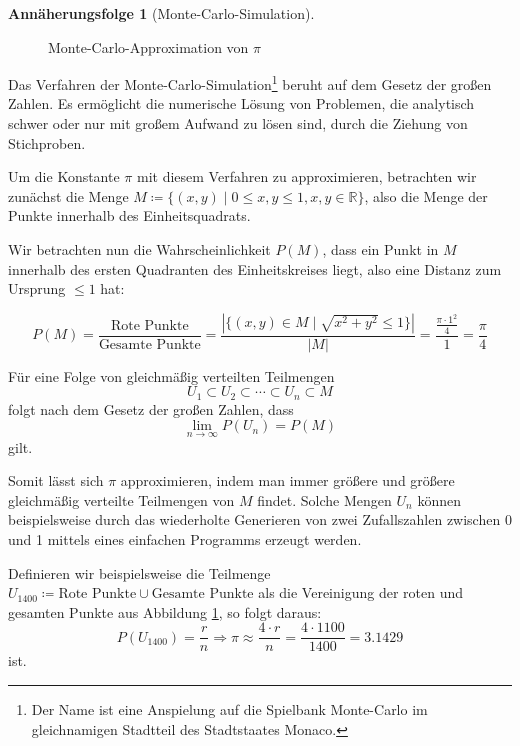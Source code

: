 \documentclass{scrartcl}
\theoremstyle{definition}
\newtheorem{approximation sequence}{Annäherungsfolge}
\begin{document}
\begin{approximation sequence}[Monte-Carlo-Simulation]~\\[12pt]
\begin{figure}[H]
    \centering
    
    \caption{Monte-Carlo-Approximation von \(\pi\)}
    \label{fig:monte-carlo-approximation}
\end{figure}

Das Verfahren der Monte-Carlo-Simulation\footnote{Der Name ist eine Anspielung
auf die Spielbank Monte-Carlo im gleichnamigen Stadtteil des Stadtstaates
Monaco.\cite{anderson:1986:metropolis}} beruht auf dem Gesetz der großen
Zahlen. Es ermöglicht die numerische Lösung von Problemen, die analytisch
schwer oder nur mit großem Aufwand zu lösen sind, durch die Ziehung von
Stichproben.

Um die Konstante \(\pi\) mit diesem Verfahren zu approximieren, betrachten wir
zunächst die Menge \(M \coloneq \{(x, y) \mid 0 \le x,y \le 1, x, y \in
\mathbb{R}\}\), also die Menge der Punkte innerhalb des Einheitsquadrats.

Wir betrachten nun die Wahrscheinlichkeit \(P(M)\), dass ein Punkt in \(M\)
innerhalb des ersten Quadranten des Einheitskreises liegt, also eine Distanz
zum Ursprung \(\le 1\) hat:

\begin{equation}
    P(M) = \frac{\text{Rote Punkte}}{\text{Gesamte Punkte}} = \frac{|\{(x, y) \in M \mid \sqrt{x^2 + y^2} \le 1\}|}{|M|} = \frac{\frac{\pi \cdot 1^2}{4}}{1} = \frac{\pi}{4}
\end{equation}

Für eine Folge von gleichmäßig verteilten Teilmengen
\begin{equation}
    U_1 \subset U_2 \subset \cdots \subset U_n \subset M
\end{equation}
folgt nach dem Gesetz der großen Zahlen, dass
\begin{equation}
    \lim_{n \to \infty} P(U_n) = P(M)
\end{equation}
gilt.

Somit lässt sich \(\pi\) approximieren, indem man immer größere und größere
gleichmäßig verteilte Teilmengen von \(M\) findet. Solche Mengen \(U_n\) können
beispielsweise durch das wiederholte Generieren von zwei Zufallszahlen zwischen
0 und 1 mittels eines einfachen Programms erzeugt werden.

Definieren wir beispielsweise die Teilmenge \(U_{1400} \coloneq \text{Rote
Punkte} \cup \text{Gesamte Punkte}\) als die Vereinigung der roten und gesamten
Punkte aus Abbildung \ref{fig:monte-carlo-approximation}, so folgt daraus:
\begin{equation}
    P(U_{1400}) = \frac{r}{n} \Rightarrow \pi \approx \frac{4 \cdot r}{n} = \frac{4 \cdot 1100}{1400} = 3.1429
\end{equation}
ist.

\end{approximation sequence}
\end{document}
